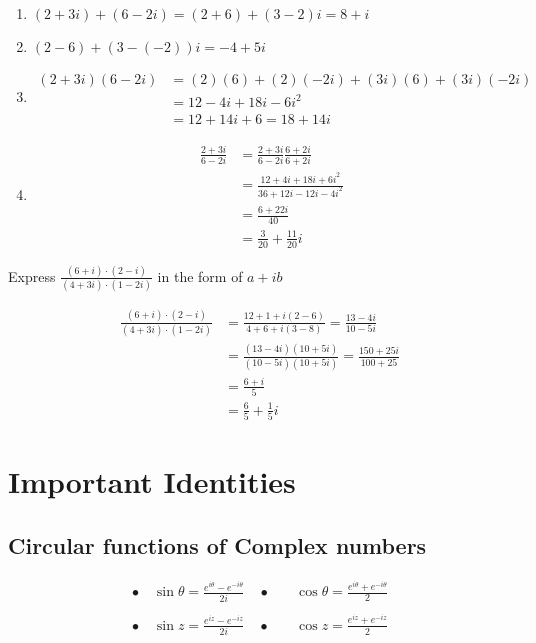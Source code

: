 \begin{answer}\hspace{0.5cm}
		\begin{enumerate}
		\item $(2+3 i)+(6-2 i)=(2+6)+(3-2) i=8+i $
		
		\item $(2-6)+(3-(-2)) i=-4+5 i $
		\item
		\begin{align*}
		(2+3 i)(6-2 i)&=(2)(6)+(2)(-2 i)+(3 i)(6)+(3 i)(-2 i)\\
		&=12-4 i+18 i-6 i^{2}\\&=12+14 i+6=18+14 i
		\end{align*}
		\item 
		\begin{align*}
		\frac{2+3 i}{6-2 i}&=\frac{2+3 i}{6-2 i} \frac{6+2 i}{6+2 i}\\
		&=\frac{12+4 i+18 i+6 i^{2}}{36+12 i-12 i-4 i^{2}}\\
		&=\frac{6+22 i}{40}\\&=\frac{3}{20}+\frac{11}{20} i
		\end{align*}
	\end{enumerate}
\end{answer}
\begin{exercise}
	Express $\frac{(6+i) \cdot(2-i)}{(4+3 i) \cdot(1-2 i)}$ in the form of $a+i b$
\end{exercise}
\begin{answer}
	\begin{align*} \frac{(6+i) \cdot(2-i)}{(4+3 i) \cdot(1-2 i)} &=\frac{12+1+i(2-6)}{4+6+i(3-8)}=\frac{13-4 i}{10-5 i} \\ &=\frac{(13-4 i)(10+5 i)}{(10-5 i)(10+5 i)}=\frac{150+25 i}{100+25}\\&=\frac{6+i}{5}\\&=\frac{6}{5}+\frac{1}{5} i \end{align*}
\end{answer}


\section{Important Identities}
\subsection{Circular functions of Complex numbers}

\begin{align*}
	\bullet\quad\sin \theta=\frac{e^{i \theta}-e^{-i \theta}}{2 i}\quad\bullet&\quad\cos \theta=\frac{e^{i \theta}+e^{-i \theta}}{2}\\\\
\bullet\quad\sin z=\frac{e^{i z}-e^{-i z}}{2 i}\quad\bullet&\quad\cos z=\frac{e^{i z}+e^{-i z}}{2}
\end{align*}

